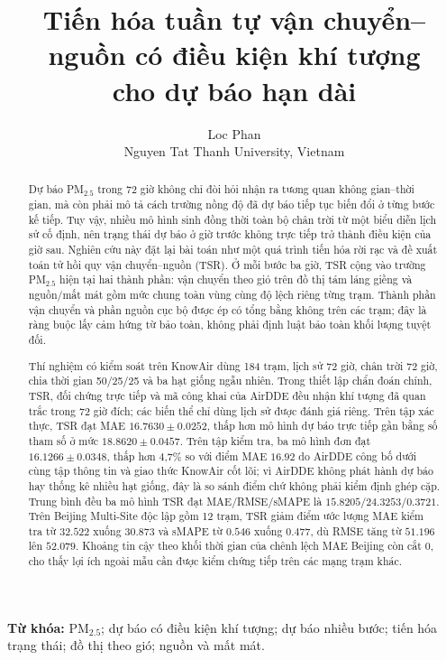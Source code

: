 \documentclass[10pt,a4paper]{article}
\title{\vspace{-1.3cm}\bfseries
Tiến hóa tuần tự vận chuyển--nguồn có điều kiện khí tượng\\
cho dự báo \pmfine{} hạn dài}
\author{Loc Phan\\[-0.1em]
\small Nguyen Tat Thanh University, Vietnam\\}
\date{}
\newcommand{\pmfine}{PM$_{2.5}$}
\newcommand{\modelname}{TSR}
\begin{document}
\maketitle
\vspace{-1.2em}

\begin{abstract}
Dự báo \pmfine{} trong 72 giờ không chỉ đòi hỏi nhận ra tương quan không gian--thời gian, mà còn phải mô tả cách trường nồng độ đã dự báo tiếp tục biến đổi ở từng bước kế tiếp. Tuy vậy, nhiều mô hình sinh đồng thời toàn bộ chân trời từ một biểu diễn lịch sử cố định, nên trạng thái dự báo ở giờ trước không trực tiếp trở thành điều kiện của giờ sau. Nghiên cứu này đặt lại bài toán như một quá trình tiến hóa rời rạc và đề xuất toán tử hồi quy vận chuyển--nguồn (\modelname). Ở mỗi bước ba giờ, \modelname{} cộng vào trường \pmfine{} hiện tại hai thành phần: vận chuyển theo gió trên đồ thị tám láng giềng và nguồn/mất mát gồm mức chung toàn vùng cùng độ lệch riêng từng trạm. Thành phần vận chuyển và phần nguồn cục bộ được ép có tổng bằng không trên các trạm; đây là ràng buộc lấy cảm hứng từ bảo toàn, không phải định luật bảo toàn khối lượng tuyệt đối.

Thí nghiệm có kiểm soát trên KnowAir dùng 184 trạm, lịch sử 72 giờ, chân trời 72 giờ, chia thời gian 50/25/25 và ba hạt giống ngẫu nhiên. Trong thiết lập chẩn đoán chính, \modelname{}, đối chứng trực tiếp và mã công khai của AirDDE đều nhận khí tượng đã quan trắc trong 72 giờ đích; các biến thể chỉ dùng lịch sử được đánh giá riêng. Trên tập xác thực, \modelname{} đạt MAE $16.7630\pm0.0252$, thấp hơn mô hình dự báo trực tiếp gần bằng số tham số ở mức $18.8620\pm0.0457$. Trên tập kiểm tra, ba mô hình đơn đạt $16.1266\pm0.0348$, thấp hơn 4,7\% so với điểm MAE $16.92$ do AirDDE công bố dưới cùng tập thông tin và giao thức KnowAir cốt lõi; vì AirDDE không phát hành dự báo hay thống kê nhiều hạt giống, đây là so sánh điểm chứ không phải kiểm định ghép cặp. Trung bình đều ba mô hình \modelname{} đạt MAE/RMSE/sMAPE là $15.8205/24.3253/0.3721$. Trên Beijing Multi-Site độc lập gồm 12 trạm, \modelname{} giảm điểm ước lượng MAE kiểm tra từ $32.522$ xuống $30.873$ và sMAPE từ $0.546$ xuống $0.477$, dù RMSE tăng từ $51.196$ lên $52.079$. Khoảng tin cậy theo khối thời gian của chênh lệch MAE Beijing còn cắt 0, cho thấy lợi ích ngoài mẫu cần được kiểm chứng tiếp trên các mạng trạm khác.
\end{abstract}

\noindent\textbf{Từ khóa:} \pmfine; dự báo có điều kiện khí tượng; dự báo nhiều bước; tiến hóa trạng thái; đồ thị theo gió; nguồn và mất mát.
\end{document}
